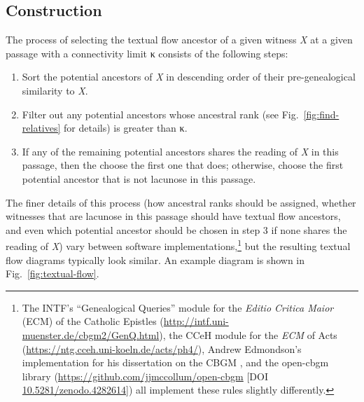 \documentclass[a4paper, 12pt]{article}
\begin{document}
	\newpage
	
	\subsection{Construction}
	
	The process of selecting the textual flow ancestor of a given witness \emph{X} at a given passage with a connectivity limit κ consists of the following steps:
	\begin{enumerate}
		\item Sort the potential ancestors of \emph{X} in descending order of their pre-genealogical similarity to \emph{X}.
		\item Filter out any potential ancestors whose ancestral rank (see Fig.~\ref{fig:find-relatives} for details) is greater than κ.
		\item If any of the remaining potential ancestors shares the reading of \emph{X} in this passage, then the choose the first one that does; otherwise, choose the first potential ancestor that is not lacunose in this passage.
	\end{enumerate}
	The finer details of this process (how ancestral ranks should be assigned, whether witnesses that are lacunose in this passage should have textual flow ancestors, and even which potential ancestor should be chosen in step 3 if none shares the reading of \emph{X}) vary between software implementations,\footnote{The INTF's ``Genealogical Queries'' module for the \emph{Editio Critica Maior} (ECM) of the Catholic Epistles (\url{http://intf.uni-muenster.de/cbgm2/GenQ.html}), the CCeH module for the \emph{ECM} of Acts (\url{https://ntg.cceh.uni-koeln.de/acts/ph4/}), Andrew Edmondson's implementation for his dissertation on the CBGM \parencite[code available online at \url{https://github.com/edmondac/CBGM} {[DOI \href{http://doi.org/10.5281/zenodo.1296288}{10.5281/zenodo.1296288}]}]{Edmondson19}, and the \textsf{open-cbgm} library (\url{https://github.com/jjmccollum/open-cbgm} {[DOI \href{http://doi.org/10.5281/zenodo.4282614}{10.5281/zenodo.4282614}]}) all implement these rules slightly differently.} but the resulting textual flow diagrams typically look similar. An example diagram is shown in Fig.~\ref{fig:textual-flow}.
	
\end{document}
